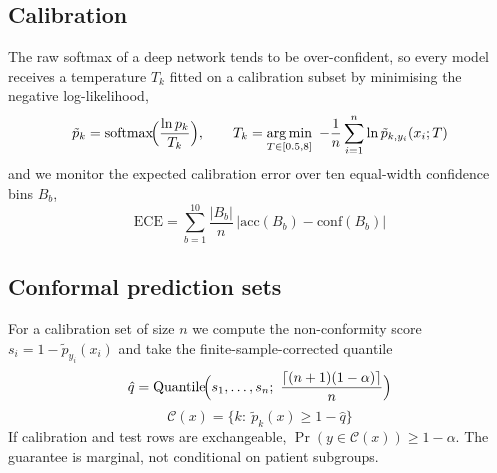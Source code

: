\documentclass[conference]{IEEEtran}
\DeclareMathOperator*{\argmin}{arg\,min}
\DeclareMathOperator{\softmax}{softmax}
\begin{document}
\subsection{Calibration}
The raw softmax of a deep network tends to be over-confident, so every model receives a temperature $T_k$ fitted on a calibration subset by minimising the negative log-likelihood,
\begin{equation}
\tilde p_k=\softmax\!\Bigl(\frac{\ln p_k}{T_k}\Bigr),\qquad
T_k=\argmin_{T\in[0.5,8]}\ -\frac1n\sum_{i=1}^{n}\ln\tilde p_{k,y_i}(x_i;T)
\label{eq:T}
\end{equation}
and we monitor the expected calibration error over ten equal-width confidence bins $B_b$,
\begin{equation}
\mathrm{ECE}=\sum_{b=1}^{10}\frac{|B_b|}{n}\,\bigl|\mathrm{acc}(B_b)-\mathrm{conf}(B_b)\bigr|
\label{eq:ece}
\end{equation}

\subsection{Conformal prediction sets}
For a calibration set of size $n$ we compute the non-conformity score $s_i=1-\tilde p_{y_i}(x_i)$ and take the finite-sample-corrected quantile \cite{vovk2005,angelopoulos2021}
\begin{equation}
\hat q=\mathrm{Quantile}\!\Bigl(s_1,\dots,s_n;\ \frac{\lceil (n+1)(1-\alpha)\rceil}{n}\Bigr)
\label{eq:q}
\end{equation}
\begin{equation}
\mathcal C(x)=\bigl\{k:\ \tilde p_k(x)\ge 1-\hat q\bigr\}
\label{eq:set}
\end{equation}
If calibration and test rows are exchangeable, $\Pr(y\in\mathcal C(x))\ge 1-\alpha$. The guarantee is marginal, not conditional on patient subgroups.
\end{document}
